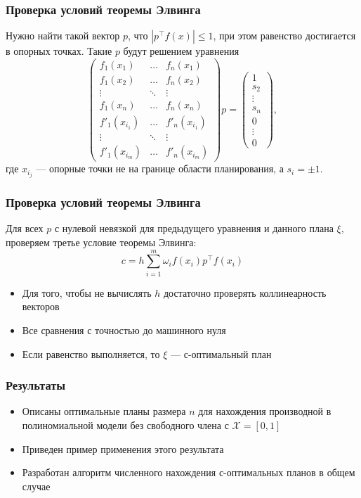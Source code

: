 \documentclass[unicode, notheorems, minimal, nologo]{beamer}
\newcommand\abs[1]{\left\lvert#1\right\rvert}
\begin{document}
\begin{frame}
	\frametitle{Проверка условий теоремы Элвинга}
	Нужно найти такой вектор $p$, что $\abs{p^\top f(x)} \leqslant 1$, при этом равенство достигается в опорных точках. Такие $p$ будут решением уравнения
	\begin{equation*}
		\begin{pmatrix}
			f_1(x_1) & \dots & f_n(x_1) \\
			f_1(x_2) & \dots & f_n(x_2) \\
  			\vdots &   \ddots & \vdots \\
  			f_1(x_n)  & \dots & f_n(x_n) \\
  			f'_1(x_{i_1}) & \dots & f'_n(x_{i_1}) \\
  			\vdots &   \ddots & \vdots \\
  			f'_1(x_{i_m})  & \dots & f'_n(x_{i_m})
		\end{pmatrix} 
		p =
		\begin{pmatrix}
			1 \\ s_2 \\ \vdots \\ s_n \\ 0 \\ \vdots \\ 0
		\end{pmatrix},
	\end{equation*}
	где $x_{i_j}$ --- опорные точки не на границе области планирования, а $s_i = \pm 1$.
\end{frame}

\begin{frame}
	\frametitle{Проверка условий теоремы Элвинга}
	Для всех $p$ с нулевой невязкой для предыдущего уравнения и данного плана $\xi$, проверяем третье условие теоремы Элвинга:
	\begin{equation*}
		c = h \sum_{i=1}^m \omega_i f(x_i) p^\top f(x_i)
	\end{equation*}
	
	\begin{itemize}
		\item Для того, чтобы не вычислять $h$ достаточно проверять коллинеарность векторов
		\item Все сравнения с точностью до машинного нуля
		\item Если равенство выполняется, то $\xi$ --- с-оптимальный план
	\end{itemize}
\end{frame}


\begin{frame}
	\frametitle{Результаты}
	\begin{itemize}
		\item Описаны оптимальные планы размера $n$ для нахождения производной в полиномиальной модели без свободного члена с $\mathcal{X} = [0, 1]$
		\item Приведен пример применения этого результата
		\item Разработан алгоритм численного нахождения с-оптимальных планов в общем случае
	\end{itemize}
\end{frame}

\end{document}
